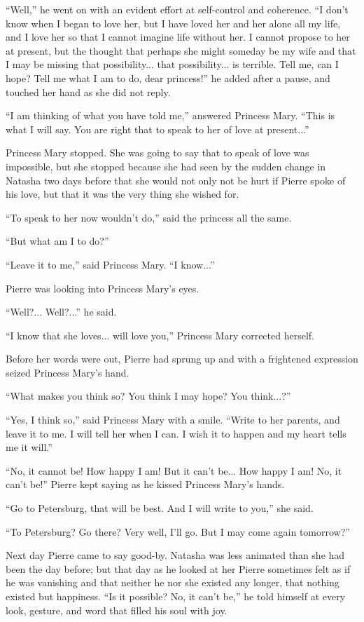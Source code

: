 ``Well,'' he went on with an evident effort at self-control and
coherence.  ``I don't know when I began to love her, but I have
loved her and her alone all my life, and I love her so that I
cannot imagine life without her. I cannot propose to her at
present, but the thought that perhaps she might someday be my
wife and that I may be missing that possibility... that
possibility... is terrible. Tell me, can I hope?  Tell me what I
am to do, dear princess!'' he added after a pause, and touched
her hand as she did not reply.

``I am thinking of what you have told me,'' answered Princess
Mary. ``This is what I will say. You are right that to speak to
her of love at present...''

Princess Mary stopped. She was going to say that to speak of love
was impossible, but she stopped because she had seen by the
sudden change in Natasha two days before that she would not only
not be hurt if Pierre spoke of his love, but that it was the very
thing she wished for.

``To speak to her now wouldn't do,'' said the princess all the
same.

``But what am I to do?''

``Leave it to me,'' said Princess Mary. ``I know...''

Pierre was looking into Princess Mary's eyes.

``Well?... Well?...'' he said.

``I know that she loves... will love you,'' Princess Mary
corrected herself.

Before her words were out, Pierre had sprung up and with a
frightened expression seized Princess Mary's hand.

``What makes you think so? You think I may hope? You think...?''

``Yes, I think so,'' said Princess Mary with a smile. ``Write to
her parents, and leave it to me. I will tell her when I can. I
wish it to happen and my heart tells me it will.''

``No, it cannot be! How happy I am! But it can't be... How happy
I am!  No, it can't be!'' Pierre kept saying as he kissed
Princess Mary's hands.

``Go to Petersburg, that will be best. And I will write to you,''
she said.

``To Petersburg? Go there? Very well, I'll go. But I may come
again tomorrow?''

Next day Pierre came to say good-by. Natasha was less animated
than she had been the day before; but that day as he looked at
her Pierre sometimes felt as if he was vanishing and that neither
he nor she existed any longer, that nothing existed but
happiness. ``Is it possible?  No, it can't be,'' he told himself
at every look, gesture, and word that filled his soul with joy.

